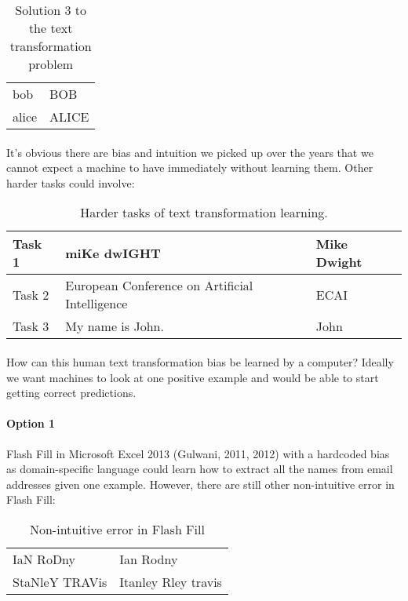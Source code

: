 \documentclass{article}
\theoremstyle{plain}
\theoremstyle{definition}
\begin{document}
\begin{multicols}{2}
\begin{table}[H]
\centering\footnotesize
\begin{tabular}{ | l | l | }
\hline
bob & BOB \\
alice & ALICE\\
\hline
\end{tabular}
\caption{Solution 3 to the text transformation problem}\label{table:MILTextTransformation3}
\end{table}

\paragraph{} It's obvious there are bias and intuition we picked up over the years that we cannot expect a machine to have immediately without learning them. Other harder tasks could involve:

\begin{table}[H]
\centering\footnotesize
\begin{tabular}{ | l | p{3.2cm} | l | }
\hline
Task 1 & miKe dwIGHT & Mike Dwight \\
\hline
Task 2 & European Conference on Artificial Intelligence & ECAI \\
\hline
Task 3 & My name is John. & John \\
\hline
\end{tabular}
\caption{Harder tasks of text transformation learning.}\label{table:MILTextTransformation3}
\end{table}

\paragraph{} How can this human text transformation bias be learned by a computer? Ideally we want machines to look at one positive example and would be able to start getting correct predictions.

\paragraph{Option 1} Flash Fill in Microsoft Excel 2013 (Gulwani, 2011, 2012) with a hardcoded bias as domain-specific language could learn how to extract all the names from email addresses given one example. However, there are still other non-intuitive error in Flash Fill:

\begin{table}[H]
\centering\footnotesize
\begin{tabular}{ | l | l | }
\hline
IaN RoDny & Ian Rodny \\
StaNleY TRAVis & Itanley Rley travis\\
\hline
\end{tabular}
\caption{Non-intuitive error in Flash Fill}\label{table:Flashfill}
\end{table}


\end{multicols}
\end{document}
